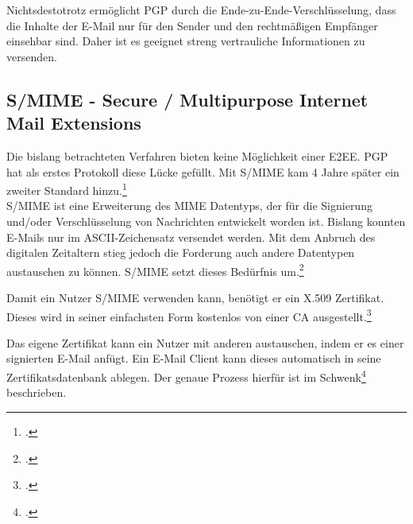 \documentclass  [paper=a4,
				fontsize=12pt,
				listof=totoc,
				bibliography=totoc
				]{scrreprt}
\begin{document}
				Nichtsdestotrotz ermöglicht \ac{PGP} durch die  Ende-zu-Ende-Verschlüsselung, dass die Inhalte der E-Mail nur für den Sender und den rechtmäßigen Empfänger einsehbar sind. Daher ist es geeignet streng vertrauliche Informationen zu versenden.
				\medskip

%				
%				
%				
%				
				
	
			\subsection{S/MIME - Secure / Multipurpose Internet Mail Extensions}
			
				Die bislang betrachteten Verfahren bieten keine Möglichkeit einer \ac{E2EE}. \ac{PGP} hat als erstes Protokoll diese Lücke gefüllt. Mit \ac{S/MIME} kam 4 Jahre später ein zweiter Standard hinzu.\footcite[Vgl.][]{Duevel}
				\medskip\\
							
				\ac{S/MIME} ist eine Erweiterung des MIME Datentyps, der für die Signierung und/oder Verschlüsselung von Nachrichten entwickelt worden ist.
				Bislang konnten E-Mails nur im ASCII-Zeichensatz versendet werden. Mit dem Anbruch des digitalen Zeitaltern stieg jedoch die Forderung auch andere Datentypen austauschen zu können. \ac{S/MIME} setzt dieses Bedürfnis um.\footcite[Vgl.][S. 57-60]{Schwenk}
				\medskip
				
				Damit ein Nutzer \ac{S/MIME} verwenden kann, benötigt er ein X.509 Zertifikat. Dieses wird in seiner einfachsten Form kostenlos von einer \ac{CA} ausgestellt.\footcite[Vgl.][]{Duevel}
				
				Das eigene Zertifikat kann ein Nutzer mit anderen austauschen, indem er es einer signierten E-Mail anfügt. Ein E-Mail Client kann dieses automatisch in seine Zertifikatsdatenbank ablegen. Der genaue Prozess hierfür ist im Schwenk\footcite[][S. 65 ff.]{Schwenk} beschrieben.
				\medskip
														
\end{document}
